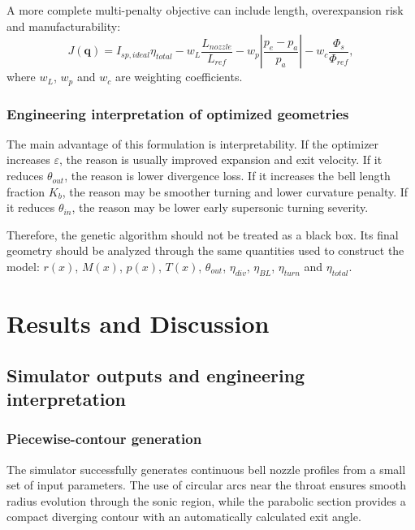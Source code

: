 \documentclass[11pt,a4paper]{article}
\begin{document}
A more complete multi-penalty objective can include length, overexpansion risk and manufacturability:
\begin{equation}
J(\bm{q})=I_{sp,ideal}\eta_{total}
-w_L\frac{L_{nozzle}}{L_{ref}}
-w_p\left|\frac{p_e-p_a}{p_a}\right|
-w_c\frac{\Phi_s}{\Phi_{ref}},
\label{eq:objective_full}
\end{equation}
where $w_L$, $w_p$ and $w_c$ are weighting coefficients.

\subsubsection{Engineering interpretation of optimized geometries}

The main advantage of this formulation is interpretability. If the optimizer increases $\varepsilon$, the reason is usually improved expansion and exit velocity. If it reduces $\theta_{out}$, the reason is lower divergence loss. If it increases the bell length fraction $K_b$, the reason may be smoother turning and lower curvature penalty. If it reduces $\theta_{in}$, the reason may be lower early supersonic turning severity.

Therefore, the genetic algorithm should not be treated as a black box. Its final geometry should be analyzed through the same quantities used to construct the model: $r(x)$, $M(x)$, $p(x)$, $T(x)$, $\theta_{out}$, $\eta_{div}$, $\eta_{BL}$, $\eta_{turn}$ and $\eta_{total}$.


\newpage
\section{Results and Discussion}

\subsection{Simulator outputs and engineering interpretation}

\subsubsection{Piecewise-contour generation}

The simulator successfully generates continuous bell nozzle profiles from a small set of input parameters. The use of circular arcs near the throat ensures smooth radius evolution through the sonic region, while the parabolic section provides a compact diverging contour with an automatically calculated exit angle.
\end{document}
